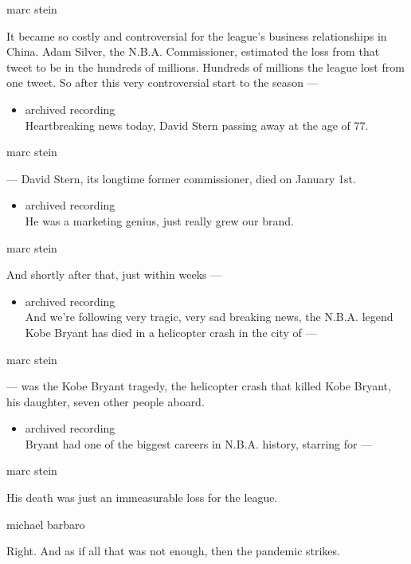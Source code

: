 marc stein

It became so costly and controversial for the league's business
relationships in China. Adam Silver, the N.B.A. Commissioner, estimated
the loss from that tweet to be in the hundreds of millions. Hundreds of
millions the league lost from one tweet. So after this very
controversial start to the season ---

\begin{itemize}
\tightlist
\item
  archived recording\\
  Heartbreaking news today, David Stern passing away at the age of 77.
\end{itemize}

marc stein

--- David Stern, its longtime former commissioner, died on January 1st.

\begin{itemize}
\tightlist
\item
  archived recording\\
  He was a marketing genius, just really grew our brand.
\end{itemize}

marc stein

And shortly after that, just within weeks ---

\begin{itemize}
\tightlist
\item
  archived recording\\
  And we're following very tragic, very sad breaking news, the N.B.A.
  legend Kobe Bryant has died in a helicopter crash in the city of ---
\end{itemize}

marc stein

--- was the Kobe Bryant tragedy, the helicopter crash that killed Kobe
Bryant, his daughter, seven other people aboard.

\begin{itemize}
\tightlist
\item
  archived recording\\
  Bryant had one of the biggest careers in N.B.A. history, starring for
  ---
\end{itemize}

marc stein

His death was just an immeasurable loss for the league.

michael barbaro

Right. And as if all that was not enough, then the pandemic strikes.

